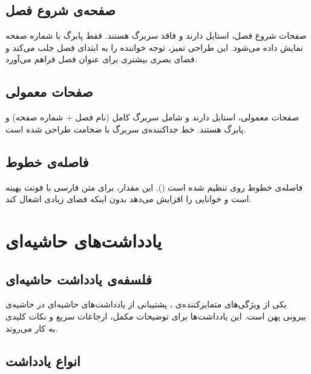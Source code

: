 \documentclass{matinbook}
\begin{document}
\section{صفحه‌ی شروع فصل}
\label{sec:pagestyles-plain}

صفحات شروع فصل، استایل  دارند و فاقد سربرگ
هستند. فقط پابرگ با شماره صفحه نمایش داده می‌شود. این
طراحی تمیز، توجه خواننده را به ابتدای فصل جلب می‌کند
و فضای بصری بیشتری برای عنوان فصل فراهم می‌آورد.

\section{صفحات معمولی}
\label{sec:pagestyles-fancy}

صفحات معمولی، استایل  دارند و شامل سربرگ کامل
(نام فصل + شماره صفحه) و پابرگ هستند. خط جداکننده‌ی
سربرگ با ضخامت \pnum{۰.۴pt} طراحی شده است.

\section{فاصله‌ی خطوط}
\label{sec:pagestyles-spacing}

فاصله‌ی خطوط  روی  تنظیم شده است
(). این مقدار، برای
متن فارسی با فونت  بهینه است و خوانایی
را افزایش می‌دهد بدون اینکه فضای زیادی اشغال کند.


\chapter{یادداشت‌های حاشیه‌ای}
\label{chap:marginnote}

\section{فلسفه‌ی یادداشت حاشیه‌ای}
\label{sec:marginnote-philosophy}

یکی از ویژگی‌های متمایزکننده‌ی ، پشتیبانی
از یادداشت‌های حاشیه‌ای در حاشیه‌ی بیرونی پهن است. این
یادداشت‌ها برای توضیحات مکمل، ارجاعات سریع و نکات کلیدی
به کار می‌روند.

\section{انواع یادداشت}
\label{sec:marginnote-types}
\end{document}
